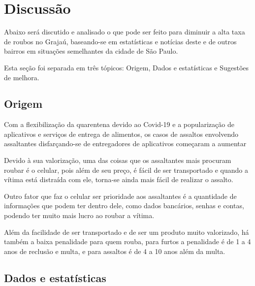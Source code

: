 \section{Discussão}

    Abaixo será discutido e analisado o que pode ser feito para diminuir a alta taxa de
    roubos no Grajaú, baseando-se em estatísticas e notícias deste e de outros bairros em 
    situações semelhantes da cidade de São Paulo.

    Esta seção foi separada em três tópicos: Origem, Dados e estatísticas e Sugestões de melhora.

    \subsection{Origem}

        Com a flexibilização da quarentena devido ao Covid-19 e a popularização de aplicativos
        e serviços de entrega de alimentos, os casos de assaltos envolvendo assaltantes 
        disfarçando-se de entregadores de aplicativos começaram a aumentar 
        
        Devido à sua valorização, uma das coisas que os assaltantes mais procuram roubar é o
        celular, pois além de seu preço, é fácil de ser transportado e quando a vítima está
        distraída com ele, torna-se ainda mais fácil de realizar o assalto.
        
        Outro fator que faz o celular ser prioridade aos assaltantes é a quantidade de informações
        que podem ter dentro dele, como dados bancários, senhas e contas, podendo ter muito mais
        lucro ao roubar a vítima.

        Além da facilidade de ser transportado e de ser um produto muito valorizado, há também a
        baixa penalidade para quem rouba, para furtos a penalidade é de 1 a 4 anos de reclusão e 
        multa, e para assaltos é de 4 a 10 anos além da multa.

    \subsection{Dados e estatísticas}

